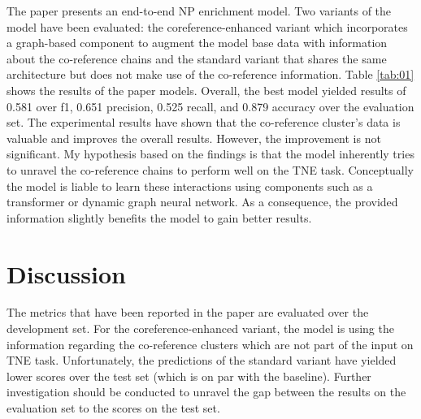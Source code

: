 \documentclass[11pt, a4paper, twocolumn]{article}
\begin{document}
The paper presents an end-to-end NP enrichment model. Two variants of the model have been evaluated: the coreference-enhanced variant which incorporates a graph-based component to augment the model base data with information about the co-reference chains and the standard variant that shares the same architecture but does not make use of the co-reference information.
Table \ref{tab:01} shows the results of the paper models.
Overall, the best model yielded results of 0.581 over f1, 0.651 precision, 0.525 recall, and 0.879 accuracy over the evaluation set.
The experimental results have shown that the co-reference cluster's data is valuable and improves the overall results. However, the improvement is not significant. My hypothesis based on the findings is that the model inherently tries to unravel the co-reference chains to perform well on the TNE task. Conceptually the model is liable to learn these interactions using components such as a transformer or dynamic graph neural network. As a consequence, the provided information slightly benefits the model to gain better results.

\section{Discussion}
\label{discussion}

The metrics that have been reported in the paper are evaluated over the development set. For the coreference-enhanced variant, the model is using the information regarding the co-reference clusters which are not part of the input on TNE task. Unfortunately, the predictions of the standard variant have yielded lower scores over the test set (which is on par with the baseline). Further investigation should be conducted to unravel the gap between the results on the evaluation set to the scores on the test set.

% 
% 
\printbibliography
\end{document}
